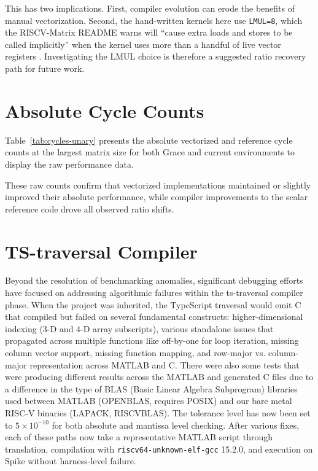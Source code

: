 This has two implications. First, compiler evolution can erode the benefits of manual vectorization. Second, the hand-written kernels here use \texttt{LMUL=8}, which the RISCV-Matrix README warns will ``cause extra loads and stores to be called implicitly'' when the kernel uses more than a handful of live vector registers \cite{riscvmatrix}. Investigating the LMUL choice is therefore a suggested ratio recovery path for future work.

\section{Absolute Cycle Counts}

Table~\ref{tab:cycles-unary} presents the absolute vectorized and reference cycle counts at the largest matrix size for both Grace and current environments to display the raw performance data.



These raw counts confirm that vectorized implementations maintained or slightly improved their absolute performance, while compiler improvements to the scalar reference code drove all observed ratio shifts.

\section{TS-traversal Compiler}

Beyond the resolution of benchmarking anomalies, significant debugging efforts have focused on addressing algorithmic failures within the ts-traversal compiler phase. When the project was inherited, the TypeScript traversal would emit C that compiled but failed on several fundamental constructs: higher-dimensional indexing (3-D and 4-D array subscripts), various standalone issues that propagated across multiple functions like off-by-one for loop iteration, missing column vector support, missing function mapping, and row-major vs. column-major representation across MATLAB and C. There were also some tests that were producing different results across the MATLAB and generated C files due to a difference in the type of BLAS (Basic Linear Algebra Subprogram) libraries used between MATLAB (OPENBLAS, requires POSIX) and our bare metal RISC-V binaries (LAPACK, RISCVBLAS). The tolerance level has now been set to $5 \times 10^{-10}$ for both absolute and mantissa level checking. After various fixes, each of these paths now take a representative MATLAB script through translation, compilation with \texttt{riscv64-unknown-elf-gcc} 15.2.0, and execution on Spike without harness-level failure.

